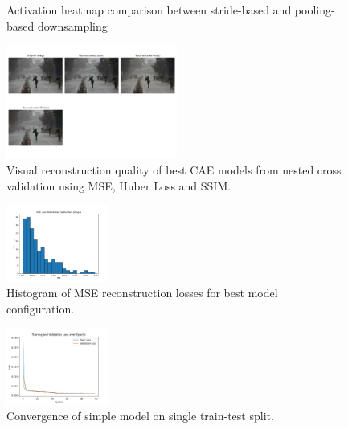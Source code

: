 \documentclass[10pt,twocolumn,letterpaper]{article}
\begin{document}
\begin{figure}[ht]
    \centering
    \caption{Activation heatmap comparison between stride-based and pooling-based downsampling}
    \label{fig:strided-versus-pooling-feature-map-comparison}
\end{figure}


\begin{figure}[ht]
    \centering
    \includegraphics[width=0.5\textwidth]{ReconstructionQualityComparisons2.png} 
    \caption{Visual reconstruction quality of best CAE models from nested cross validation using MSE, Huber Loss and SSIM.}
    \label{fig:cae-reconstruction-quality}
\end{figure}

\begin{figure}[ht]
    \centering
    \includegraphics[width=0.3\textwidth]{MSEReconstructionLossDistribution.png} %
    \caption{Histogram of MSE reconstruction losses for best model configuration.}
    \label{fig:reconstruction-loss-outlier-detection}
\end{figure}

\begin{figure}[ht]
    \centering
    \includegraphics[width=0.3\textwidth]{Convergence.png} %
    \caption{Convergence of simple model on single train-test split.}
    \label{fig:simple-convergence}
\end{figure}
\end{document}
